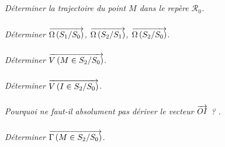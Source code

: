 \documentclass[10pt,oneside]{article}
\begin{document}
\subparagraph{}
\textit{Déterminer la trajectoire du point $M$ dans le repère $\mathcal{R}_0$.}

\subparagraph{}
\textit{Déterminer $\overrightarrow{\Omega\left( {S_1}/{S_0}\right)}$, $\overrightarrow{\Omega\left( {S_2}/{S_1}\right)}$, $\overrightarrow{\Omega\left( {S_2}/{S_0}\right)}$.}

\subparagraph{}
\textit{Déterminer $\overrightarrow{V\left( {M} \in {S_2}/{S_0}\right)}$.}

\subparagraph{}
\textit{Déterminer $\overrightarrow{V\left( {I} \in {S_2}/{S_0}\right)}$.}


\subparagraph{}
\textit{Pourquoi ne faut-il absolument pas dériver le vecteur $\overrightarrow{OI}$ ? .}

\subparagraph{}
\textit{Déterminer $\overrightarrow{\Gamma \left( {M} \in {S_2}/{S_0}\right)}$.}
\end{document}

